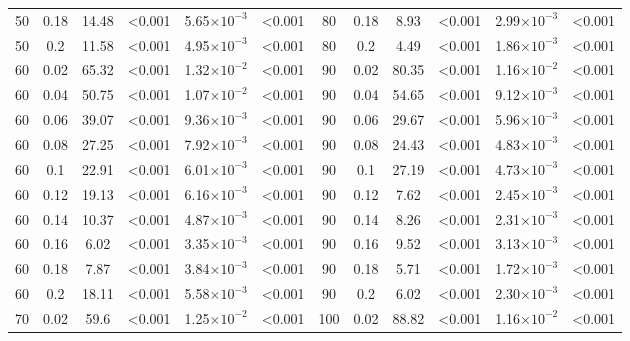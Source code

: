 \documentclass[12pt]{article}
\begin{document}
\begin{spacing}{2.0}
\begin{table}[h!]
\begin{tabular}{c c | c c| c c ||c c | c c | c c |}
                50  & 0.18  & 14.48 & \textless0.001 & 5.65$\times10^{-3}$ & \textless0.001 & 80  & 0.18  & 8.93  & \textless0.001 & 2.99$\times10^{-3}$ & \textless0.001 \\
                50  & 0.2 & 11.58 & \textless0.001 & 4.95$\times10^{-3}$ & \textless0.001 & 80  & 0.2 & 4.49  & \textless0.001 & 1.86$\times10^{-3}$ & \textless0.001 \\
                60  & 0.02  & 65.32 & \textless0.001 & 1.32$\times10^{-2}$ & \textless0.001 & 90  & 0.02  & 80.35 & \textless0.001 & 1.16$\times10^{-2}$ & \textless0.001 \\
                60  & 0.04  & 50.75 & \textless0.001 & 1.07$\times10^{-2}$ & \textless0.001 & 90  & 0.04  & 54.65 & \textless0.001 & 9.12$\times10^{-3}$ & \textless0.001 \\
                60  & 0.06  & 39.07 & \textless0.001 & 9.36$\times10^{-3}$ & \textless0.001 & 90  & 0.06  & 29.67 & \textless0.001 & 5.96$\times10^{-3}$ & \textless0.001 \\
                60  & 0.08  & 27.25 & \textless0.001 & 7.92$\times10^{-3}$ & \textless0.001 & 90  & 0.08  & 24.43 & \textless0.001 & 4.83$\times10^{-3}$ & \textless0.001 \\
                60  & 0.1 & 22.91 & \textless0.001 & 6.01$\times10^{-3}$ & \textless0.001 & 90  & 0.1 & 27.19 & \textless0.001 & 4.73$\times10^{-3}$ & \textless0.001 \\
                60  & 0.12  & 19.13 & \textless0.001 & 6.16$\times10^{-3}$ & \textless0.001 & 90  & 0.12  & 7.62  & \textless0.001 & 2.45$\times10^{-3}$ & \textless0.001 \\
                60  & 0.14  & 10.37 & \textless0.001 & 4.87$\times10^{-3}$ & \textless0.001 & 90  & 0.14  & 8.26  & \textless0.001 & 2.31$\times10^{-3}$ & \textless0.001 \\
                60  & 0.16  & 6.02  & \textless0.001 & 3.35$\times10^{-3}$ & \textless0.001 & 90  & 0.16  & 9.52  & \textless0.001 & 3.13$\times10^{-3}$ & \textless0.001 \\
                60  & 0.18  & 7.87  & \textless0.001 & 3.84$\times10^{-3}$ & \textless0.001 & 90  & 0.18  & 5.71  & \textless0.001 & 1.72$\times10^{-3}$ & \textless0.001 \\
                60  & 0.2 & 18.11 & \textless0.001 & 5.58$\times10^{-3}$ & \textless0.001 & 90  & 0.2 & 6.02  & \textless0.001 & 2.30$\times10^{-3}$ & \textless0.001 \\
                70  & 0.02  & 59.6  & \textless0.001 & 1.25$\times10^{-2}$ & \textless0.001 & 100 & 0.02  & 88.82 & \textless0.001 & 1.16$\times10^{-2}$ & \textless0.001 \\

\end{tabular}
\end{table}
\end{spacing}
\end{document}
